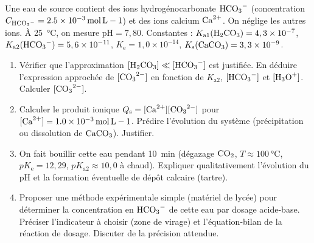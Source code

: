 \documentclass[11pt]{article}
\begin{document}
\begin{exercice}
Une eau de source contient des ions hydrogénocarbonate $\ce{HCO3-}$ (concentration $C_{\ce{HCO3-}} = \SI{2,5e-3}{mol.L-1}$) et des ions calcium $\ce{Ca^{2+}}$. On néglige les autres ions. À \SI{25}{\celsius}, on mesure $\text{pH} = 7,80$. Constantes : $K_{\text{a1}}(\ce{H2CO3}) = 4,3 \times 10^{-7}$, $K_{\text{a2}}(\ce{HCO3-}) = 5,6 \times 10^{-11}$, $K_{\text{e}} = 1,0 \times 10^{-14}$, $K_{\text{s}}(\ce{CaCO3}) = 3,3 \times 10^{-9}$.

\begin{enumerate}
    \item Vérifier que l'approximation $[\ce{H2CO3}] \ll [\ce{HCO3-}]$ est justifiée. En déduire l'expression approchée de $[\ce{CO3^{2-}}]$ en fonction de $K_{\text{a2}}$, $[\ce{HCO3-}]$ et $[\ce{H3O+}]$. Calculer $[\ce{CO3^{2-}}]$.
    \item Calculer le produit ionique $Q_{\text{s}} = [\ce{Ca^{2+}}][\ce{CO3^{2-}}]$ pour $[\ce{Ca^{2+}}] = \SI{1,0e-3}{mol.L-1}$. Prédire l'évolution du système (précipitation ou dissolution de $\ce{CaCO3}$). Justifier.
    \item On fait bouillir cette eau pendant \SI{10}{min} (dégazage $\ce{CO2}$, $T \approx \SI{100}{\celsius}$, $pK_{\text{e}} = 12,29$, $pK_{\text{a2}} \approx 10,0$ à chaud). Expliquer qualitativement l'évolution du pH et la formation éventuelle de dépôt calcaire (tartre).
    \item Proposer une méthode expérimentale simple (matériel de lycée) pour déterminer la concentration en $\ce{HCO3-}$ de cette eau par dosage acide-base. Préciser l'indicateur à choisir (zone de virage) et l'équation-bilan de la réaction de dosage. Discuter de la précision attendue.
\end{enumerate}
\end{exercice}
\end{document}
